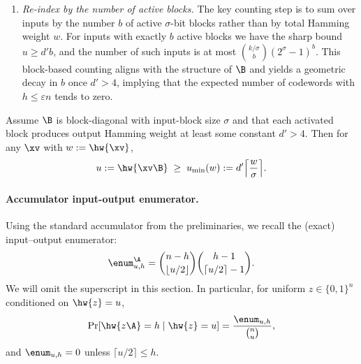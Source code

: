 \begin{enumerate}
\item \emph{Re-index by the number of active blocks.}
  The key counting step is to sum over inputs by the number $b$ of active
  $\sigma$-bit blocks rather than by total Hamming weight $w$.
  For inputs with exactly $b$ active blocks we have the sharp bound
  $u\ge d'b$, and the number of such inputs is at most
  $\binom{k/\sigma}{b}(2^\sigma-1)^b$.
  This block-based counting aligns with the structure of $\B$ and yields a
  geometric decay in $b$ once $d'>4$, implying that the expected number of
  codewords with $h\le \varepsilon n$ tends to zero.
\end{enumerate}

\fi




\begin{assumption}
Assume $\B$ is block-diagonal with input-block size $\sigma$ and that each activated block produces output Hamming weight at least some constant $d'>4$. Then for any $\xv$ with $w:=\hw{\xv}$,
\begin{equation}
\label{eq:umin_def}
 u := \hw{\xv\B} \;\ge\; u_{\min}(w) := d' \Big\lceil \frac{w}{\sigma}\Big\rceil.
\end{equation}
\end{assumption}


\paragraph{Accumulator input-output enumerator.}
Using the standard accumulator from the preliminaries, we recall the (exact) input--output enumerator:
\begin{equation}
\label{eq:acc_exact}
\enum^\A_{u,h}
=
\binom{n-h}{\lfloor u/2\rfloor}\binom{h-1}{\lceil u/2\rceil-1}.
\end{equation}
We will omit the superscript \A in this section. In particular, for uniform $z\in\{0,1\}^n$ conditioned on $\hw{z}=u$,
\begin{equation}
\label{eq:acc_prob_exact}
\Pr[\hw{z\A}=h \mid \hw{z}=u]
=
\frac{\enum_{u,h}}{\binom{n}{u}},
\end{equation}
and $\enum_{u,h}=0$ unless $\lceil u/2\rceil \le h$.



